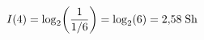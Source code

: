 \documentclass[preview]{standalone}
\begin{document}
\begin{align*}
\special{dvisvgm:raw <g id='unique000'>}I(4) = \log_2\!\left(\frac{1}{1/6}\right) = \log_2(6) = 2{,}58 \; \text{Sh}\special{dvisvgm:raw </g>}
\end{align*}
\end{document}
